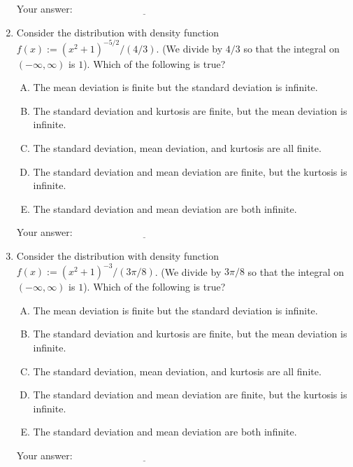 \documentclass[10pt]{amsart}
\begin{document}
\begin{enumerate}
  \vspace{0.1in}
  Your answer: $\underline{\qquad\qquad\qquad\qquad\qquad\qquad\qquad}$
  \vspace{0.15in}

\item Consider the distribution with density function $f(x):=
  (x^2+1)^{-5/2}/(4/3)$. (We divide by $4/3$ so that the integral on
  $(-\infty,\infty)$ is $1$). Which of the following is true?

  \begin{enumerate}[(A)]
  \item The mean deviation is finite but the standard deviation is infinite.
  \item The standard deviation and kurtosis are finite, but the mean deviation is infinite.
  \item The standard deviation, mean deviation, and kurtosis are all finite.
  \item The standard deviation and mean deviation are finite, but the kurtosis is infinite.
  \item The standard deviation and mean deviation are both infinite.
  \end{enumerate}

  \vspace{0.1in}
  Your answer: $\underline{\qquad\qquad\qquad\qquad\qquad\qquad\qquad}$
  \vspace{0.15in}

\item Consider the distribution with density function $f(x):=
  (x^2+1)^{-3}/(3\pi/8)$. (We divide by $3\pi/8$ so that the integral on
  $(-\infty,\infty)$ is $1$). Which of the following is true?

  \begin{enumerate}[(A)]
  \item The mean deviation is finite but the standard deviation is infinite.
  \item The standard deviation and kurtosis are finite, but the mean deviation is infinite.
  \item The standard deviation, mean deviation, and kurtosis are all finite.
  \item The standard deviation and mean deviation are finite, but the kurtosis is infinite.
  \item The standard deviation and mean deviation are both infinite.
  \end{enumerate}

  \vspace{0.1in}
  Your answer: $\underline{\qquad\qquad\qquad\qquad\qquad\qquad\qquad}$
  \vspace{0.15in}


\end{enumerate}
\end{document}

